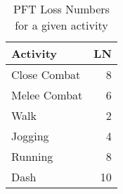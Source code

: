 \begin{table}[h]
\centering
\caption{PFT Loss Numbers for a given activity}
	\begin{tabular}{||l|r||} \hline
	Activity		&	LN	\\ \hline	
	Close Combat	&	8	\\
	Melee Combat	&	6	\\
	Walk			&	2	\\
	Jogging			&	4	\\
	Running			&	8	\\
	Dash			&	10	\\ \hline
	\end{tabular}
\end{table}
